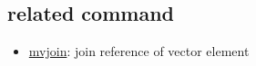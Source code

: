 \documentclass[a4paper]{jarticle}
\begin{document}
\subsection*{related command}
\begin{itemize}
\item \href{run:mvjoin.pdf}{mvjoin}: join reference of vector element
\end{itemize}
\end{document}
